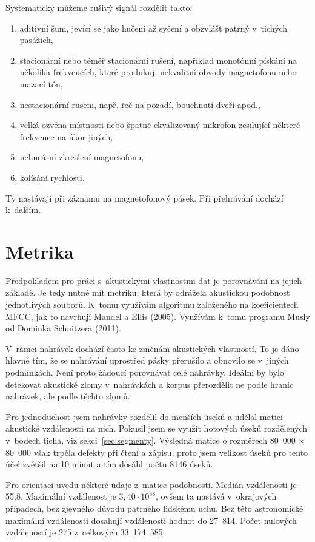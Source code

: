 Systematicky můžeme rušivý signál rozdělit takto:
\begin{enumerate}
\item{
    aditivní šum, jevící se jako hučení až syčení a obzvlášť patrný v~tichých
    pasážích,
}
\item{
    stacionární nebo téměř stacionární rušení, například monotónní pískání na
    několika frekvencích, které produkuji nekvalitní obvody magnetofonu
    nebo mazací tón,
}
\item{
    nestacionární ruseni, např. řeč na pozadí, bouchnutí dveří apod.,
}
\item{
    velká ozvěna místnosti nebo špatně ekvalizovaný mikrofon zesilující
    některé frekvence na úkor jiných,
}
\item{
    nelineární zkreslení magnetofonu,
}
\item{
    kolísání rychlosti.
}
\end{enumerate}
Ty nastávají při záznamu na magnetofonový pásek. Při přehrávání dochází
k~dalším.

\section{Metrika}
\label{sec:akustika:metrika}

Předpokladem pro práci s~akustickými vlastnostmi dat je porovnávání na jejich
základě. Je tedy nutné mít metriku, která by odrážela akustickou podobnost
jednotlivých souborů. K~tomu využívám algoritmu založeného na koeficientech
MFCC, jak to navrhují Mandel a Ellis (2005)\cite{mandel2005song}. Využívám
k~tomu programu Musly od Dominka Schnitzera (2011)\cite{schnitzer2011using}.

V~rámci nahrávek dochází často ke změnám akustických vlastností. To je dáno
hlavně tím, že se nahrávání uprostřed pásky přerušilo a obnovilo se v~jiných
podmínkách. Není proto žádoucí porovnávat celé nahrávky. Ideální by bylo
detekovat akustické zlomy v~nahrávkách a korpus přerozdělit ne podle hranic
nahrávek, ale podle těchto zlomů.

Pro jednoduchost jsem nahrávky rozdělil do menších úseků a udělal matici
akustické vzdálenosti na nich. Pokusil jsem se využít hotových úseků rozdělených
v~bodech ticha, viz sekci~\ref{sec:segmenty}. Výsledná matice o rozměrech
80~000 × 80~000 však trpěla defekty při čtení a zápisu, proto jsem velikost
úseků pro tento účel zvětšil na 10 minut a tím dosáhl počtu 8146 úseků.

Pro orientaci uvedu některé údaje z~matice podobnosti. 
Medián vzdálenosti je 55,8.
Maximální vzdálenost je $3,40\cdot{}10^{38}$, ovšem ta nastává v~okrajových
případech, bez zjevného důvodu patrného lidskému uchu. Bez této astronomické
maximální vzdálenosti dosahují vzdálenosti hodnot do 27~814.
Počet nulových vzdáleností je 275 z~celkových 33~174~585.



